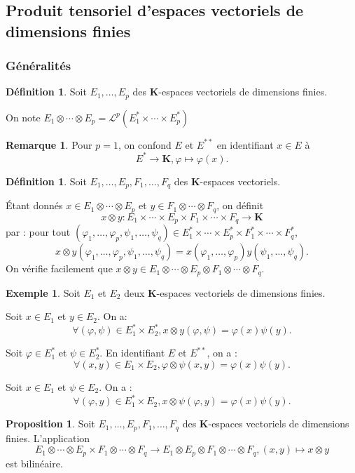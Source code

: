 \documentclass[12pt,a4paper]{article}
\theoremstyle{definition}
\newtheorem{prop}[thm]{Proposition}
\newtheorem{defn}[thm]{Définition}
\newtheorem{ex}[thm]{Exemple}
\newtheorem{rqe}[thm]{Remarque}
\begin{document}
\subsection{Produit tensoriel d'espaces vectoriels de dimensions finies}
\subsubsection{Généralités}
\begin{defn}
Soit $E_1,\ldots,E_p$ des $\mathbf{K}$-espaces vectoriels de dimensions finies.

On note $E_1\otimes\cdots\otimes E_p=\mathcal{L}^p\left(E_1^*\times\cdots\times E_p^*\right)$
\end{defn}
\begin{rqe}
Pour $p=1$, on confond $E$ et $E^{**}$ en identifiant $x\in E$ à
$$E^*\to\mathbf{K},\varphi\mapsto\varphi(x).$$
\end{rqe}
\begin{defn}
Soit $E_1,\ldots,E_p,F_1,\ldots,F_q$ des $\mathbf{K}$-espaces vectoriels.

Étant donnés $x\in E_1\otimes\cdots\otimes E_p$ et $y\in F_1\otimes\cdots\otimes F_q$, on définit
$$x\otimes y:E_1\times \cdots\times E_p\times F_1\times\cdots\times F_q\to\mathbf{K}$$
par : pour tout $(\varphi_1,\ldots,\varphi_p,\psi_1,\ldots,\psi_q)\in E_1^*\times\cdots\times E_p^*\times F_1^*\times\cdots\times F_q^*$,
$$
x\otimes y(\varphi_1,\ldots,\varphi_p,\psi_1,\ldots,\psi_q)= x(\varphi_1,\ldots,\varphi_p)y(\psi_1,\ldots,\psi_q).
$$
On vérifie facilement que $x\otimes y\in E_1\otimes\cdots\otimes E_p\otimes F_1\otimes\cdots\otimes F_q$.
\end{defn}
\begin{ex}
Soit $E_1$ et $E_2$ deux $\mathbf{K}$-espaces vectoriels de dimensions finies.

Soit $x\in E_1$ et $y\in E_2$. On a:
$$\forall (\varphi,\psi)\in E_1^*\times E_2^*, x\otimes y(\varphi,\psi)=\varphi(x)\psi(y).$$

Soit $\varphi\in E_1^*$ et $\psi\in E_2^*$. En identifiant $E$ et $E^{**}$, on a :
$$\forall (x,y)\in E_1\times E_2,\varphi\otimes\psi(x,y)=\varphi(x)\psi(y).$$

Soit $x\in E_1$ et $\psi\in E_2$. On a :
$$\forall (\varphi,y)\in E_1^*\times E_2,x\otimes\psi(\varphi,y)=\varphi(x)\psi(y).$$
\end{ex}
\begin{prop}
Soit $E_1,\ldots,E_p,F_1,\ldots,F_q$ des $\mathbf{K}$-espaces vectoriels de dimensions finies. L'application
$$E_1\otimes\cdots\otimes E_p\times F_1\otimes\cdots\otimes F_q\to E_1\otimes E_p\otimes F_1\otimes\cdots\otimes F_q,(x,y)\mapsto x\otimes y$$
est bilinéaire.
\end{prop}
\end{document}
